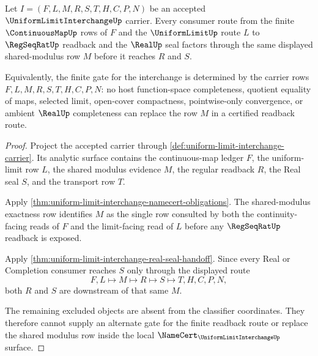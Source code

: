 \begin{theorem}
\label{thm:uniform-limit-interchange-shared-modulus-determinacy}
Let $I=(F,L,M,R,S,T,H,C,P,N)$ be an accepted $\UniformLimitInterchangeUp$ carrier. Every consumer route from the finite $\ContinuousMapUp$ rows of $F$ and the $\UniformLimitUp$ route $L$ to $\RegSeqRatUp$ readback and the $\RealUp$ seal factors through the same displayed shared-modulus row $M$ before it reaches $R$ and $S$.

Equivalently, the finite gate for the interchange is determined by the carrier rows $F,L,M,R,S,T,H,C,P,N$: no host function-space completeness, quotient equality of maps, selected limit, open-cover compactness, pointwise-only convergence, or ambient $\RealUp$ completeness can replace the row $M$ in a certified readback route.
\end{theorem}
\begin{proof}
Project the accepted carrier through \autoref{def:uniform-limit-interchange-carrier}. Its analytic surface contains the continuous-map ledger $F$, the uniform-limit row $L$, the shared modulus evidence $M$, the regular readback $R$, the Real seal $S$, and the transport row $T$.

Apply \autoref{thm:uniform-limit-interchange-namecert-obligations}. The shared-modulus exactness row identifies $M$ as the single row consulted by both the continuity-facing reads of $F$ and the limit-facing read of $L$ before any $\RegSeqRatUp$ readback is exposed.

Apply \autoref{thm:uniform-limit-interchange-real-seal-handoff}. Since every Real or Completion consumer reaches $S$ only through the displayed route
$$
F,L \longmapsto M \longmapsto R \longmapsto S \longmapsto T,H,C,P,N ,
$$
both $R$ and $S$ are downstream of that same $M$.

The remaining excluded objects are absent from the classifier coordinates. They therefore cannot supply an alternate gate for the finite readback route or replace the shared modulus row inside the local $\NameCert_{\UniformLimitInterchangeUp}$ surface.
\end{proof}


